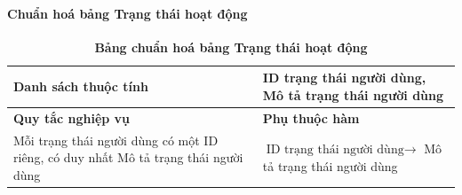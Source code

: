 \paragraph{Chuẩn hoá bảng Trạng thái hoạt động}
\mbox{}
\begin{table}[H]
	\caption{\bfseries \fontsize{12pt}{0pt}\selectfont Bảng chuẩn hoá bảng Trạng thái hoạt động}
	\centering
	\begin{tabularx}{0.9\textwidth}{|X|X|}
		\hline
		\textbf{Danh sách thuộc tính} & ID trạng thái người dùng, Mô tả trạng thái người dùng                                             \\
		\hline
		\textbf{Quy tắc nghiệp vụ}    & \textbf{Phụ thuộc hàm}                                                                            \\
		\hline
		Mỗi trạng thái người dùng có một ID riêng, có duy nhất Mô tả trạng thái người dùng
		                              & \parbox[t]{\linewidth}{$\text{ID trạng thái người dùng} \rightarrow$ Mô tả trạng thái người dùng} \\
		\hline
		                                          \\
		                                                     \\
		\hline
	\end{tabularx}
\end{table}

